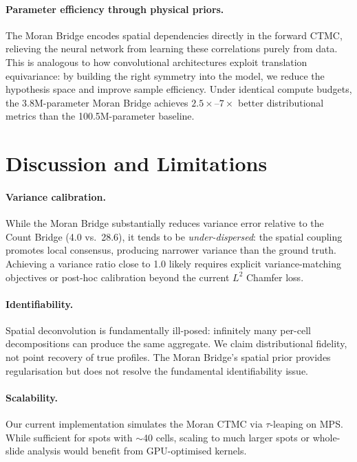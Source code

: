 \documentclass[11pt]{article}
\begin{document}
\paragraph{Parameter efficiency through physical priors.}
The Moran Bridge encodes spatial dependencies directly in the forward CTMC, relieving the neural network from learning these correlations purely from data. This is analogous to how convolutional architectures exploit translation equivariance: by building the right symmetry into the model, we reduce the hypothesis space and improve sample efficiency. Under identical compute budgets, the 3.8M-parameter Moran Bridge achieves $2.5\times$--$7\times$ better distributional metrics than the 100.5M-parameter baseline.

\section{Discussion and Limitations}
\label{sec:discussion}

\paragraph{Variance calibration.}
While the Moran Bridge substantially reduces variance error relative to the Count Bridge (4.0 vs.\ 28.6), it tends to be \emph{under-dispersed}: the spatial coupling promotes local consensus, producing narrower variance than the ground truth. Achieving a variance ratio close to 1.0 likely requires explicit variance-matching objectives or post-hoc calibration beyond the current $L^2$ Chamfer loss.

\paragraph{Identifiability.}
Spatial deconvolution is fundamentally ill-posed: infinitely many per-cell decompositions can produce the same aggregate. We claim distributional fidelity, not point recovery of true profiles. The Moran Bridge's spatial prior provides regularisation but does not resolve the fundamental identifiability issue.

\paragraph{Scalability.}
Our current implementation simulates the Moran CTMC via $\tau$-leaping on MPS. While sufficient for spots with $\sim$40 cells, scaling to much larger spots or whole-slide analysis would benefit from GPU-optimised kernels.
\end{document}

